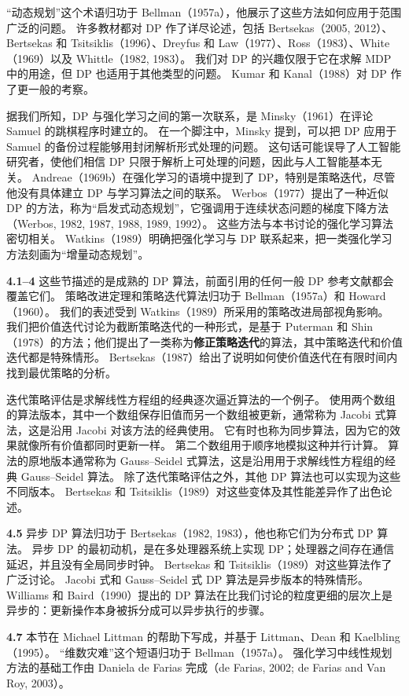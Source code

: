 \documentclass[UTF8,12pt,a4paper,fontset=fandol]{ctexart}
\begin{document}
“动态规划”这个术语归功于 Bellman（1957a），他展示了这些方法如何应用于范围广泛的问题。
许多教材都对 DP 作了详尽论述，包括 Bertsekas（2005, 2012）、Bertsekas 和 Tsitsiklis（1996）、Dreyfus 和 Law（1977）、Ross（1983）、White（1969）以及 Whittle（1982, 1983）。
我们对 DP 的兴趣仅限于它在求解 MDP 中的用途，但 DP 也适用于其他类型的问题。
Kumar 和 Kanal（1988）对 DP 作了更一般的考察。

据我们所知，DP 与强化学习之间的第一次联系，是 Minsky（1961）在评论 Samuel 的跳棋程序时建立的。
在一个脚注中，Minsky 提到，可以把 DP 应用于 Samuel 的备份过程能够用封闭解析形式处理的问题。
这句话可能误导了人工智能研究者，使他们相信 DP 只限于解析上可处理的问题，因此与人工智能基本无关。
Andreae（1969b）在强化学习的语境中提到了 DP，特别是策略迭代，尽管他没有具体建立 DP 与学习算法之间的联系。
Werbos（1977）提出了一种近似 DP 的方法，称为“启发式动态规划”，它强调用于连续状态问题的梯度下降方法（Werbos, 1982, 1987, 1988, 1989, 1992）。
这些方法与本书讨论的强化学习算法密切相关。
Watkins（1989）明确把强化学习与 DP 联系起来，把一类强化学习方法刻画为“增量动态规划”。

\noindent\textbf{4.1--4}
这些节描述的是成熟的 DP 算法，前面引用的任何一般 DP 参考文献都会覆盖它们。
策略改进定理和策略迭代算法归功于 Bellman（1957a）和 Howard（1960）。
我们的表述受到 Watkins（1989）所采用的策略改进局部视角影响。
我们把价值迭代讨论为截断策略迭代的一种形式，是基于 Puterman 和 Shin（1978）的方法；他们提出了一类称为\textbf{修正策略迭代}的算法，其中策略迭代和价值迭代都是特殊情形。
Bertsekas（1987）给出了说明如何使价值迭代在有限时间内找到最优策略的分析。

迭代策略评估是求解线性方程组的经典逐次逼近算法的一个例子。
使用两个数组的算法版本，其中一个数组保存旧值而另一个数组被更新，通常称为 Jacobi 式算法，这是沿用 Jacobi 对该方法的经典使用。
它有时也称为同步算法，因为它的效果就像所有价值都同时更新一样。
第二个数组用于顺序地模拟这种并行计算。
算法的原地版本通常称为 Gauss--Seidel 式算法，这是沿用用于求解线性方程组的经典 Gauss--Seidel 算法。
除了迭代策略评估之外，其他 DP 算法也可以实现为这些不同版本。
Bertsekas 和 Tsitsiklis（1989）对这些变体及其性能差异作了出色论述。

\noindent\textbf{4.5}
异步 DP 算法归功于 Bertsekas（1982, 1983），他也称它们为分布式 DP 算法。
异步 DP 的最初动机，是在多处理器系统上实现 DP；处理器之间存在通信延迟，并且没有全局同步时钟。
Bertsekas 和 Tsitsiklis（1989）对这些算法作了广泛讨论。
Jacobi 式和 Gauss--Seidel 式 DP 算法是异步版本的特殊情形。
Williams 和 Baird（1990）提出的 DP 算法在比我们讨论的粒度更细的层次上是异步的：更新操作本身被拆分成可以异步执行的步骤。

\noindent\textbf{4.7}
本节在 Michael Littman 的帮助下写成，并基于 Littman、Dean 和 Kaelbling（1995）。
“维数灾难”这个短语归功于 Bellman（1957a）。
强化学习中线性规划方法的基础工作由 Daniela de Farias 完成（de Farias, 2002; de Farias and Van Roy, 2003）。
\end{document}
